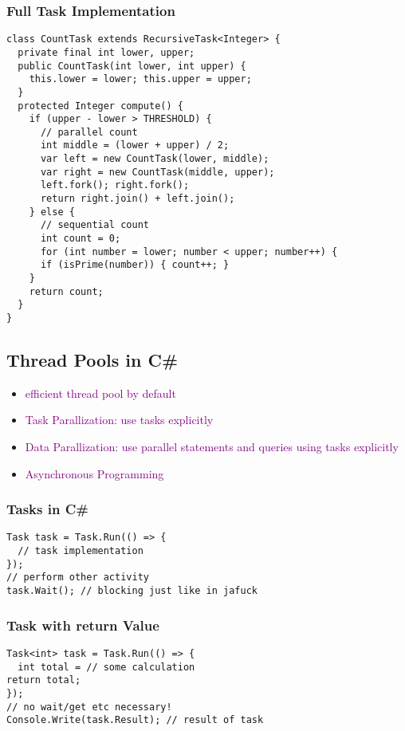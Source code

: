\documentclass[main.tex,fontsize=8pt,paper=a4,paper=portrait,DIV=calc,]{scrartcl}
\begin{document}
\subsubsection{Full Task Implementation}
\begin{lstlisting}
class CountTask extends RecursiveTask<Integer> {
  private final int lower, upper;
  public CountTask(int lower, int upper) {
    this.lower = lower; this.upper = upper;
  }
  protected Integer compute() {
    if (upper - lower > THRESHOLD) {
      // parallel count
      int middle = (lower + upper) / 2;
      var left = new CountTask(lower, middle);
      var right = new CountTask(middle, upper);
      left.fork(); right.fork();
      return right.join() + left.join();
    } else {
      // sequential count
      int count = 0;
      for (int number = lower; number < upper; number++) {
      if (isPrime(number)) { count++; }
    }
    return count;
  }
}
\end{lstlisting}

\lstset{
  language=[sharp]C,
    style=code,
}

\subsection{Thread Pools in C\#}
\begin{itemize}
\item \textcolor{purple}{efficient thread pool by default}
\item \textcolor{purple}{Task Parallization: use tasks explicitly}
\item \textcolor{purple}{Data Parallization: use parallel statements and queries using tasks explicitly}
\item \textcolor{purple}{Asynchronous Programming}
\end{itemize} 

\subsubsection{Tasks in C\#}
\begin{lstlisting}
Task task = Task.Run(() => {
  // task implementation
});
// perform other activity
task.Wait(); // blocking just like in jafuck
\end{lstlisting}

\subsubsection{Task with return Value}
\begin{lstlisting}
Task<int> task = Task.Run(() => {
  int total = // some calculation
return total;
});
// no wait/get etc necessary!
Console.Write(task.Result); // result of task
\end{lstlisting}
\end{document}
